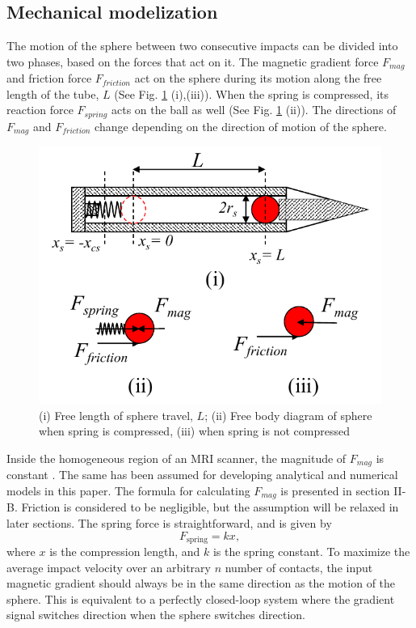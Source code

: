 \documentclass[letterpaper, 10 pt, conference]{ieeeconf}  %
\begin{document}
\subsection{Mechanical modelization}
The motion of the sphere between two consecutive impacts can be divided into two  phases, based on the forces that act on it. The magnetic gradient force $F_{mag}$ and friction force $F_{friction}$ act on the sphere during its motion along the free length of the tube, $L$ (See Fig. \ref{FBD} (i),(iii)). When the spring is compressed, its reaction force $F_{spring}$ acts on the ball as well (See Fig. \ref{FBD} (ii)). The directions of $F_{mag}$ and $F_{friction}$  change depending on the direction of motion of the sphere. 
\begin{figure}
	\includegraphics[width=\linewidth]{FBD_R1.pdf}
	\caption{(i) Free length of sphere travel, $L$; (ii) Free body diagram of sphere when spring is compressed, (iii) when spring is not compressed}
	\label{FBD}
\end{figure}
Inside the homogeneous region of an MRI scanner, the magnitude of $F_{mag}$ is constant \cite{CMR:CMR20163}. The same has been assumed for developing analytical and numerical models in this paper. The formula for calculating $F_{mag}$ is presented in section II-B. Friction is considered to be negligible, but the assumption will be relaxed in later sections. The spring force is straightforward, and is given by
\begin{equation}
F_{\text{spring}}=k x,
\label{spring_force}
\end{equation}
where $x$ is the compression length, and $k$ is the spring constant. To maximize the average impact velocity over an arbitrary $n$ number of contacts, the input magnetic gradient should always be in the same direction as the motion of the sphere. This is equivalent to a perfectly closed-loop system where the gradient signal switches direction when the sphere switches direction.
\end{document}
